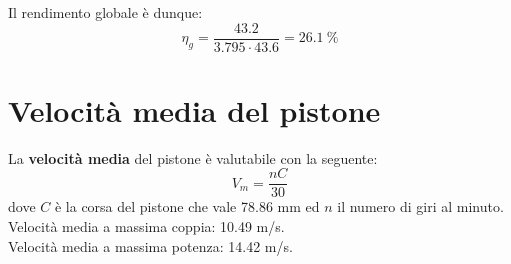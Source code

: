 \documentclass[a4paper,12pt]{article}
\begin{document}
Il rendimento globale è dunque:
\begin{equation*}
    \eta_g = \frac{43.2}{3.795\cdot 43.6} = 26.1\ \%
\end{equation*}

\section{Velocità media del pistone}
La \textbf{velocità media} del pistone è valutabile con la seguente:
\begin{equation}
    V_m = \frac{nC}{30}    
\end{equation}
dove $C$ è la corsa del pistone che vale 78.86 mm ed $n$ il numero di giri al minuto. \\
Velocità media a massima coppia: 10.49 m/s. \\
Velocità media a massima potenza: 14.42 m/s. 
\end{document}
